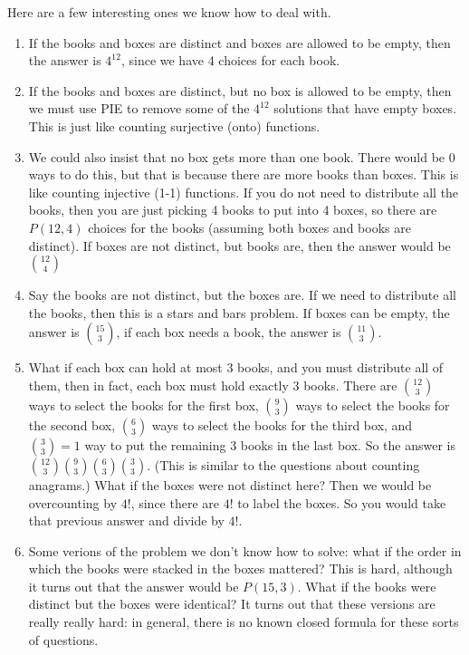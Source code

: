 \documentclass[11pt]{exam}
\begin{document}
\begin{questions}
\begin{solution}
	Here are a few interesting ones we know how to deal with.  
	\begin{enumerate}
		\item If the books and boxes are distinct and boxes are allowed to be empty, then the answer is $4^{12}$, since we have 4 choices for each book. 
		\item If the books and boxes are distinct, but no box is allowed to be empty, then we must use PIE to remove some of the $4^{12}$ solutions that have empty boxes.  This is just like counting surjective (onto) functions.
		\item We could also insist that no box gets more than one book.  There would be 0 ways to do this, but that is because there are more books than boxes.  This is like counting injective (1-1) functions.  If you do not need to distribute all the books, then you are just picking 4 books to put into 4 boxes, so there are $P(12,4)$ choices for the books (assuming both boxes and books are distinct).  If boxes are not distinct, but books are, then the answer would be $\binom{12}{4}$
		\item Say the books are not distinct, but the boxes are.  If we need to distribute all the books, then this is a stars and bars problem.  If boxes can be empty, the answer is $\binom{15}{3}$, if each box needs a book, the answer is $\binom{11}{3}$.
		\item What if each box can hold at most 3 books, and you must distribute all of them, then in fact, each box must hold exactly 3 books.  There are $\binom{12}{3}$ ways to select the books for the first box, $\binom{9}{3}$ ways to select the books for the second box, $\binom{6}{3}$ ways to select the books for the third box, and $\binom{3}{3} = 1$ way to put the remaining 3 books in the last box.  So the answer is $\binom{12}{3}\binom{9}{3}\binom{6}{3}\binom{3}{3}$.  (This is similar to the questions about counting anagrams.)  What if the boxes were not distinct here?  Then we would be overcounting by $4!$, since there are $4!$ to label the boxes.  So you would take that previous answer and divide by $4!$.
		\item Some verions of the problem we don't know how to solve: what if the order in which the books were stacked in the boxes mattered?  This is hard, although it turns out that the answer would be $P(15,3)$.  What if the books were distinct but the boxes were identical?  It turns out that these versions are really really hard: in general, there is no known closed formula for these sorts of questions. 
	\end{enumerate}
	

\end{solution}
\end{questions}
\end{document}
